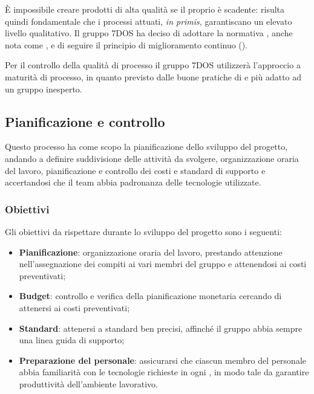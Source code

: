 
	È impossibile creare prodotti di alta qualità se il proprio  è scadente: risulta quindi fondamentale che i processi attuati, \emph{in primis}, garantiscano un elevato livello qualitativo. Il gruppo 7DOS ha deciso di adottare la normativa , anche nota come , e di seguire il principio di miglioramento continuo ().
	
Per il controllo della qualità di processo il gruppo 7DOS utilizzerà l'approccio a maturità di processo, in quanto previsto dalle buone pratiche di  e più adatto ad un gruppo inesperto.


\subsection{Pianificazione e controllo}
Questo processo ha come scopo la pianificazione dello sviluppo del progetto, andando a definire suddivisione delle attività da svolgere, organizzazione oraria del lavoro, pianificazione e controllo dei costi e standard di supporto e accertandosi che il team abbia padronanza delle tecnologie utilizzate.
\subsubsection{Obiettivi}
Gli obiettivi da rispettare durante lo sviluppo del progetto sono i seguenti:
	\begin{itemize}
		\item{\textbf{Pianificazione}: organizzazione oraria del lavoro, prestando attenzione nell'assegnazione dei compiti ai vari membri del gruppo e attenendosi ai costi preventivati;
		}
		\item{\textbf{Budget}: controllo e verifica della pianificazione monetaria cercando di attenersi ai costi preventivati;
		}
		\item{\textbf{Standard}: attenersi a standard ben precisi, affinché il gruppo abbia sempre una linea guida di supporto;
		}
		\item{\textbf{Preparazione del personale}: assicurarsi che ciascun membro del personale abbia familiarità con le tecnologie richieste in ogni , in modo tale da garantire produttività dell'ambiente lavorativo.
		}
	\end{itemize}
